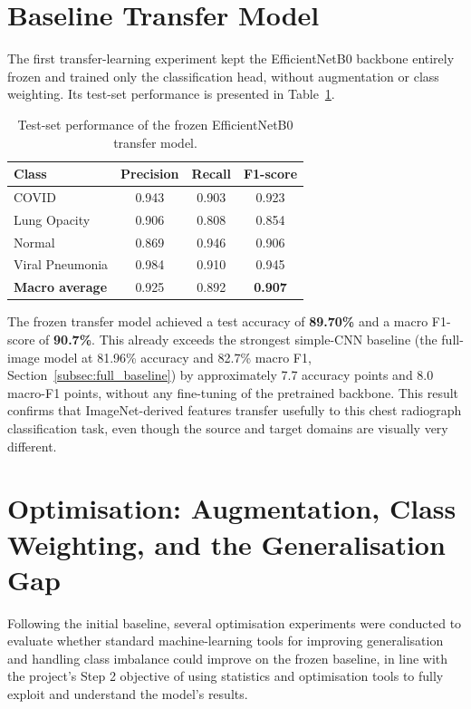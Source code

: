 \section{Baseline Transfer Model}
\label{sec:transfer_baseline}

The first transfer-learning experiment kept the EfficientNetB0 backbone
entirely frozen and trained only the classification head, without
augmentation or class weighting. Its test-set performance is presented in
Table~\ref{tab:transfer_baseline_results}.

\begin{table}[H]
\centering
\caption{Test-set performance of the frozen EfficientNetB0 transfer model.}
\label{tab:transfer_baseline_results}
\begin{tabular}{lccc}
\toprule
\textbf{Class} & \textbf{Precision} & \textbf{Recall} & \textbf{F1-score} \\
\midrule
COVID            & 0.943 & 0.903 & 0.923 \\
Lung Opacity     & 0.906 & 0.808 & 0.854 \\
Normal           & 0.869 & 0.946 & 0.906 \\
Viral Pneumonia  & 0.984 & 0.910 & 0.945 \\
\midrule
\textbf{Macro average} & 0.925 & 0.892 & \textbf{0.907} \\
\bottomrule
\end{tabular}
\end{table}

The frozen transfer model achieved a test accuracy of \textbf{89.70\%} and a
macro F1-score of \textbf{90.7\%}. This already exceeds the strongest
simple-CNN baseline (the full-image model at 81.96\% accuracy and 82.7\%
macro F1, Section~\ref{subsec:full_baseline}) by approximately 7.7 accuracy
points and 8.0 macro-F1 points, without any fine-tuning of the pretrained
backbone. This result confirms that ImageNet-derived features transfer
usefully to this chest radiograph classification task, even though the
source and target domains are visually very different.

\section{Optimisation: Augmentation, Class Weighting, and the Generalisation Gap}
\label{sec:transfer_optimisation}

Following the initial baseline, several optimisation experiments were
conducted to evaluate whether standard machine-learning tools for improving
generalisation and handling class imbalance could improve on the frozen
baseline, in line with the project's Step 2 objective of using statistics
and optimisation tools to fully exploit and understand the model's results.

